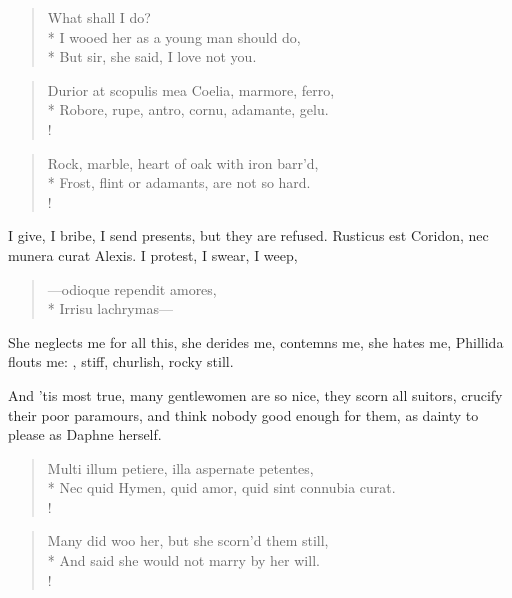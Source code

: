 \begin{verse}
What shall I do?\\*
I wooed her as a young man should do,\\*
But sir, she said, I love not you.
\end{verse}

\begin{latin}%
\begin{verse}%
Durior at scopulis mea Coelia, marmore, ferro,\\*
Robore, rupe, antro, cornu, adamante, gelu.\\!
\end{verse}%
\end{latin}%
\translationrule%
\begin{verse}%
Rock, marble, heart of oak with iron barr'd,\\*
Frost, flint or adamants, are not so hard.\\!
\end{verse}%
%

I give, I bribe, I send presents, but they are refused. Rusticus
est Coridon, nec munera curat Alexis. I protest, I swear, I weep,
%
\begin{latin}%
\begin{verse}%
---odioque rependit amores,\\*
Irrisu lachrymas---
\end{verse}%
\end{latin}%
%

She neglects me for all this, she derides me, contemns me, she hates
me, Phillida flouts me: , stiff,
churlish, rocky still.

And 'tis most true, many gentlewomen are so nice, they scorn all
suitors, crucify their poor paramours, and think nobody good enough for
them, as dainty to please as Daphne herself.
%
\begin{latin}%
\begin{verse}%
Multi illum petiere, illa aspernate petentes,\\*
Nec quid Hymen, quid amor, quid sint connubia curat.\\!
\end{verse}%
\end{latin}%
\translationrule%
\begin{verse}%
Many did woo her, but she scorn'd them still,\\*
And said she would not marry by her will.\\!
\end{verse}%
%

